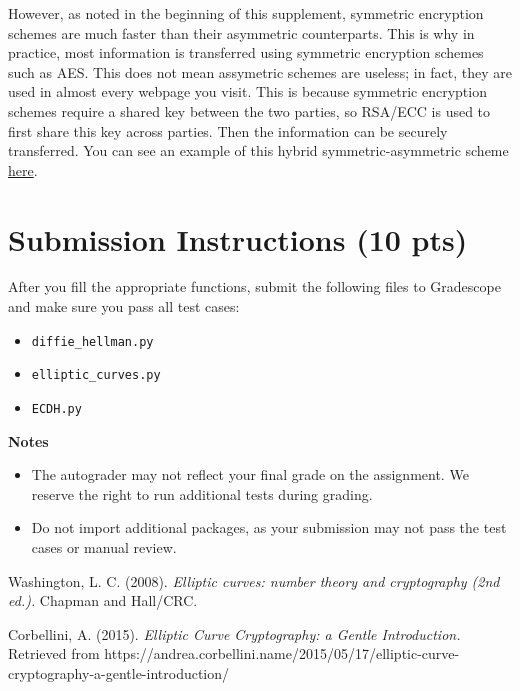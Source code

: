 \documentclass{article}
\begin{document}
    \vspace{3mm}
    However, as noted in the beginning of this supplement, symmetric encryption schemes are much faster than their asymmetric counterparts. This is why in practice, most information is transferred using symmetric encryption schemes such as AES. This does not mean assymetric schemes are useless; in fact, they are used in almost every webpage you visit. This is because symmetric encryption schemes require a shared key between the two parties, so RSA/ECC is used to first share this key across parties. Then the information can be securely transferred. You can see an example of this hybrid symmetric-asymmetric scheme \href{https://github.com/nakov/Practical-Cryptography-for-Developers-Book/blob/master/asymmetric-key-ciphers/ecc-encryption-decryption.md}{here}.

\section*{Submission Instructions (10 pts)}
    After you fill the appropriate functions, submit the following files to Gradescope and make sure you pass all test cases:
    \begin{itemize}
        \item \lstinline{diffie_hellman.py}
        \item \lstinline{elliptic_curves.py}
        \item \lstinline{ECDH.py}
    \end{itemize}

    \vspace{3mm}
    \textbf{Notes}
    \begin{itemize}
        \item The autograder may not reflect your final grade on the assignment. We reserve the right to run additional tests during grading.
        \item Do not import additional packages, as your submission may not pass the test cases or manual review.
    \end{itemize}

\begin{thebibliography}{9}
    Washington, L. C. (2008). \textit{Elliptic curves: number theory and cryptography (2nd ed.).} Chapman and Hall/CRC.

Corbellini, A. (2015). \textit{Elliptic Curve Cryptography: a Gentle Introduction.} Retrieved from https://andrea.corbellini.name/2015/05/17/elliptic-curve-cryptography-a-gentle-introduction/
\end{thebibliography}
\end{document}
